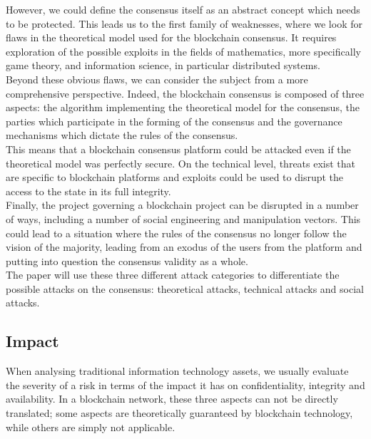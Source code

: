 \documentclass[11pt,a4paper,draft]{article}
\begin{document}
However, we could define the consensus itself as an abstract concept which needs to be protected. This leads us to the first family of weaknesses, where we look for flaws in the theoretical model used for the blockchain consensus. It requires exploration of the possible exploits in the fields of mathematics, more specifically game theory, and information science, in particular distributed systems.\\

Beyond these obvious flaws, we can consider the subject from a more comprehensive perspective. Indeed, the blockchain consensus is composed of three aspects: the algorithm implementing the theoretical model for the consensus, the parties which participate in the forming of the consensus and the governance mechanisms which dictate the rules of the consensus.\\

This means that a blockchain consensus platform could be attacked even if the theoretical model was perfectly secure. On the technical level, threats exist that are specific to blockchain platforms and exploits could be used to disrupt the access to the state in its full integrity.\\

Finally, the project governing a blockchain project can be disrupted in a number of ways, including a number of social engineering and manipulation vectors. This could lead to a situation where the rules of the consensus no longer follow the vision of the majority, leading from an exodus of the users from the platform and putting into question the consensus validity as a whole.\\

The paper will use these three different attack categories to differentiate the possible attacks on the consensus: theoretical attacks, technical attacks and social attacks.\\

\subsection{Impact}

When analysing traditional information technology assets, we usually evaluate the severity of a risk in terms of the impact it has on confidentiality, integrity and availability. In a blockchain network, these three aspects can not be directly translated; some aspects are theoretically guaranteed by blockchain technology, while others are simply not applicable.\\
\end{document}
